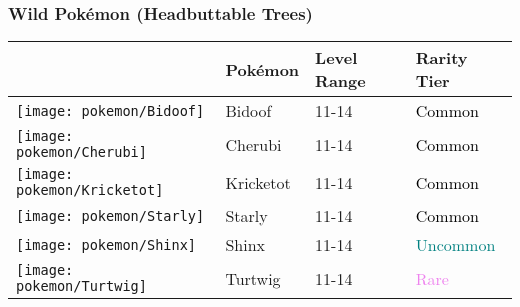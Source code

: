 \subsubsection{Wild Pokémon (Headbuttable Trees)}%
\label{ssubsec:WildPokmon(HeadbuttableTrees)}%
\begin{longtable}{||l l l l||}%
\hline%
&Pokémon&Level Range&Rarity Tier\\%
\hline%
\endhead%
\hline%
\texttt{[image: pokemon/Bidoof]}&Bidoof&11{-}14&\textcolor{black}{%
Common%
}\\%
\hline%
\texttt{[image: pokemon/Cherubi]}&Cherubi&11{-}14&\textcolor{black}{%
Common%
}\\%
\hline%
\texttt{[image: pokemon/Kricketot]}&Kricketot&11{-}14&\textcolor{black}{%
Common%
}\\%
\hline%
\texttt{[image: pokemon/Starly]}&Starly&11{-}14&\textcolor{black}{%
Common%
}\\%
\hline%
\texttt{[image: pokemon/Shinx]}&Shinx&11{-}14&\textcolor{teal}{%
Uncommon%
}\\%
\hline%
\texttt{[image: pokemon/Turtwig]}&Turtwig&11{-}14&\textcolor{violet}{%
Rare%
}\\%
\hline%
\end{longtable}%
\caption{Wild Pokemon in Eterna Forest (Headbuttable Trees)}